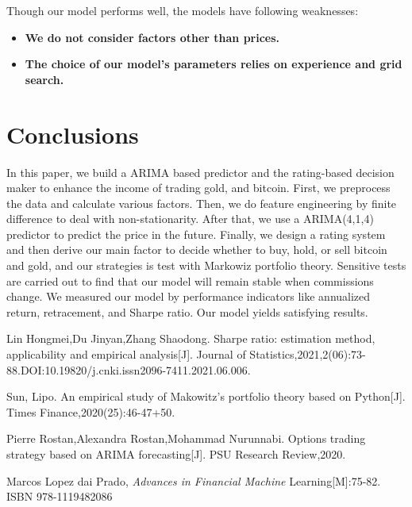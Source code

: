 \documentclass[12pt,a4paper]{article}
\newcommand{\Predictor}{ARIMA }
\begin{document}
\begin{spacing}{1.2}
Though our model performs well, the models have following weaknesses:

\begin{itemize}
\item \textbf{We do not consider factors other than prices.}

\item \textbf{The choice of our model's parameters relies on experience and grid search.}
\end{itemize}


\section{Conclusions}
\label{Conclusions}

In this paper, we build a \Predictor based predictor and the rating-based decision maker to enhance the income of trading gold, and bitcoin. First, we preprocess the data and calculate various factors. Then, we do feature engineering by finite difference to deal with non-stationarity. After that, we use a ARIMA(4,1,4) predictor to predict the price in the future. Finally, we design a rating system and then derive our main factor to decide whether to buy, hold, or sell bitcoin and gold, and our strategies is test with Markowiz portfolio theory. Sensitive tests  are carried out to find that our model will remain stable when commissions change. We measured our model by performance indicators like annualized return, retracement, and Sharpe ratio. Our model yields satisfying results.




\newpage
\begin{thebibliography}{00}


Lin Hongmei,Du Jinyan,Zhang Shaodong. Sharpe ratio: estimation method, applicability and empirical analysis[J]. Journal of Statistics,2021,2(06):73-88.DOI:10.19820/j.cnki.issn2096-7411.2021.06.006.

Sun, Lipo. An empirical study of Makowitz's portfolio theory based on Python[J]. Times Finance,2020(25):46-47+50.

Pierre Rostan,Alexandra Rostan,Mohammad Nurunnabi. Options trading strategy based on ARIMA forecasting[J]. PSU Research Review,2020.


Marcos Lopez dai Prado, \textit{Advances in Financial Machine} Learning[M]:75-82. ISBN 978-1119482086


\end{thebibliography}
\end{spacing}
\end{document}
